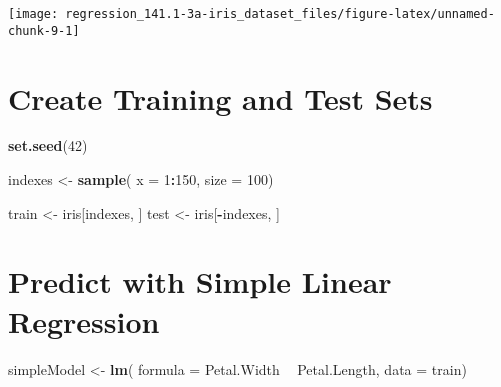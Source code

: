 \documentclass[]{book}
\newenvironment{Shaded}{\begin{snugshade}}{\end{snugshade}}
\newcommand{\DataTypeTok}[1]{\textcolor[rgb]{0.13,0.29,0.53}{#1}}
\newcommand{\DecValTok}[1]{\textcolor[rgb]{0.00,0.00,0.81}{#1}}
\newcommand{\KeywordTok}[1]{\textcolor[rgb]{0.13,0.29,0.53}{\textbf{#1}}}
\newcommand{\NormalTok}[1]{#1}
\newcommand{\OperatorTok}[1]{\textcolor[rgb]{0.81,0.36,0.00}{\textbf{#1}}}
\newcommand{\StringTok}[1]{\textcolor[rgb]{0.31,0.60,0.02}{#1}}
\begin{document}
\begin{center}\texttt{[image: regression\_141.1-3a-iris\_dataset\_files/figure-latex/unnamed-chunk-9-1]} \end{center}

\hypertarget{create-training-and-test-sets}{%
\section{Create Training and Test Sets}\label{create-training-and-test-sets}}

\begin{Shaded}
\begin{Highlighting}[]
\KeywordTok{set.seed}\NormalTok{(}\DecValTok{42}\NormalTok{)}
\end{Highlighting}
\end{Shaded}

\begin{Shaded}
\begin{Highlighting}[]
\NormalTok{indexes <-}\StringTok{ }\KeywordTok{sample}\NormalTok{(}
  \DataTypeTok{x =} \DecValTok{1}\OperatorTok{:}\DecValTok{150}\NormalTok{, }
  \DataTypeTok{size =} \DecValTok{100}\NormalTok{)}
\end{Highlighting}
\end{Shaded}

\begin{Shaded}
\begin{Highlighting}[]
\NormalTok{train <-}\StringTok{ }\NormalTok{iris[indexes, ]}
\NormalTok{test <-}\StringTok{ }\NormalTok{iris[}\OperatorTok{-}\NormalTok{indexes, ]}
\end{Highlighting}
\end{Shaded}

\hypertarget{predict-with-simple-linear-regression}{%
\section{Predict with Simple Linear Regression}\label{predict-with-simple-linear-regression}}

\begin{Shaded}
\begin{Highlighting}[]
\NormalTok{simpleModel <-}\StringTok{ }\KeywordTok{lm}\NormalTok{(}
  \DataTypeTok{formula =}\NormalTok{ Petal.Width }\OperatorTok{~}\StringTok{ }\NormalTok{Petal.Length,}
  \DataTypeTok{data =}\NormalTok{ train)}
\end{Highlighting}
\end{Shaded}
\end{document}
